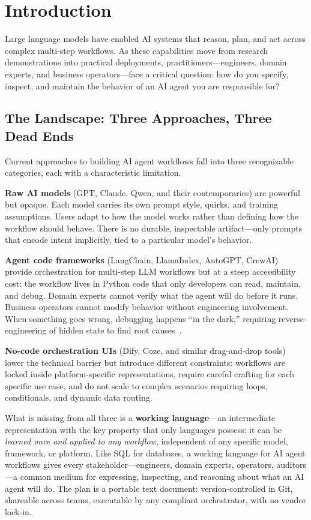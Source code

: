\section{Introduction}

Large language models have enabled AI systems that reason, plan, and act across complex multi-step workflows. As these capabilities move from research demonstrations into practical deployments, practitioners---engineers, domain experts, and business operators---face a critical question: how do you specify, inspect, and maintain the behavior of an AI agent you are responsible for?

\subsection{The Landscape: Three Approaches, Three Dead Ends}

Current approaches to building AI agent workflows fall into three recognizable categories, each with a characteristic limitation.

\textbf{Raw AI models} (GPT, Claude, Qwen, and their contemporaries) are powerful but opaque. Each model carries its own prompt style, quirks, and training assumptions. Users adapt to how the model works rather than defining how the workflow should behave. There is no durable, inspectable artifact---only prompts that encode intent implicitly, tied to a particular model's behavior.

\textbf{Agent code frameworks} (LangChain, LlamaIndex, AutoGPT, CrewAI) provide orchestration for multi-step LLM workflows but at a steep accessibility cost: the workflow lives in Python code that only developers can read, maintain, and debug. Domain experts cannot verify what the agent will do before it runs. Business operators cannot modify behavior without engineering involvement. When something goes wrong, debugging happens ``in the dark,'' requiring reverse-engineering of hidden state to find root causes~\cite{patel2025}.

\textbf{No-code orchestration UIs} (Dify, Coze, and similar drag-and-drop tools) lower the technical barrier but introduce different constraints: workflows are locked inside platform-specific representations, require careful crafting for each specific use case, and do not scale to complex scenarios requiring loops, conditionals, and dynamic data routing.

What is missing from all three is a \textbf{working language}---an intermediate representation with the key property that only languages possess: it can be \textit{learned once and applied to any workflow}, independent of any specific model, framework, or platform. Like SQL for databases, a working language for AI agent workflows gives every stakeholder---engineers, domain experts, operators, auditors---a common medium for expressing, inspecting, and reasoning about what an AI agent will do. The plan is a portable text document: version-controlled in Git, shareable across teams, executable by any compliant orchestrator, with no vendor lock-in.

